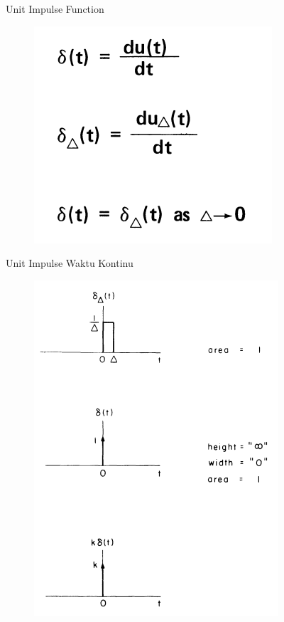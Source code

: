 \documentclass[pdflatex,compress,mathserif]{beamer}
\begin{document}
\begin{frame}{Unit Impulse Function}
	\begin{figure}
		\centering
		\includegraphics[height=0.4\textheight]{img/02.slide_06}
	\end{figure}
\end{frame}

\begin{frame}{Unit Impulse Waktu Kontinu}
	\begin{figure}
		\centering
		\includegraphics[height=0.8\textheight]{img/02.slide_07}
	\end{figure}
\end{frame}
\end{document}
